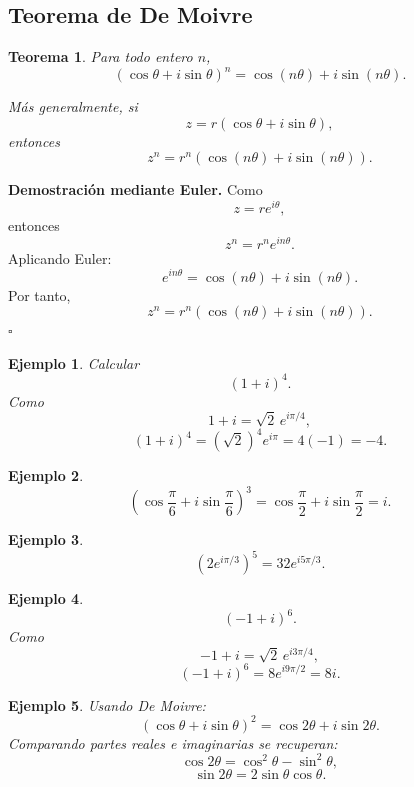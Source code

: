 \documentclass[12pt]{article}
\newtheorem{Ejem}{Ejemplo}
\newtheorem{Teo}{Teorema}
\begin{document}
\subsection*{Teorema de De Moivre}


\begin{Teo}

Para todo entero $n$,
\[
\boxed{
(\cos\theta+i\sin\theta)^n
=
\cos(n\theta)+i\sin(n\theta).
}
\]



Más generalmente, si
\[
z=r(\cos\theta+i\sin\theta),
\]
entonces
\[
\boxed{
z^n
=
r^n
\left(
\cos(n\theta)+i\sin(n\theta)
\right).
}
\]
\end{Teo}



\textbf{Demostración mediante Euler.}
Como
\[
z=re^{i\theta},
\]
entonces
\[
z^n
=
r^ne^{in\theta}.
\]
Aplicando Euler:
\[
e^{in\theta}
=
\cos(n\theta)+i\sin(n\theta).
\]
Por tanto,
\[
z^n
=
r^n
\left(
\cos(n\theta)+i\sin(n\theta)
\right).
\]
\hfill$\square$

\begin{Ejem}

Calcular
\[
(1+i)^4.
\]
Como
\[
1+i=\sqrt2\,e^{i\pi/4},
\]
\[
(1+i)^4
=
(\sqrt2)^4e^{i\pi}
=
4(-1)
=
\boxed{-4}.
\]

\end{Ejem}


\begin{Ejem}
\[
\left(
\cos\frac{\pi}{6}
+i\sin\frac{\pi}{6}
\right)^3
=
\cos\frac{\pi}{2}
+i\sin\frac{\pi}{2}
=
i.
\]

\end{Ejem}


\begin{Ejem}
\[
(2e^{i\pi/3})^5
=
32e^{i5\pi/3}.
\]

\end{Ejem}


\begin{Ejem}
\[
(-1+i)^6.
\]
Como
\[
-1+i
=
\sqrt2\,e^{i3\pi/4},
\]
\[
(-1+i)^6
=
8e^{i9\pi/2}
=
8i.
\]

\end{Ejem}


\begin{Ejem}
Usando De Moivre:
\[
(\cos\theta+i\sin\theta)^2
=
\cos2\theta+i\sin2\theta.
\]
Comparando partes reales e imaginarias se recuperan:
\[
\cos2\theta=\cos^2\theta-\sin^2\theta,
\]
\[
\sin2\theta=2\sin\theta\cos\theta.
\]
\end{Ejem}
\end{document}
